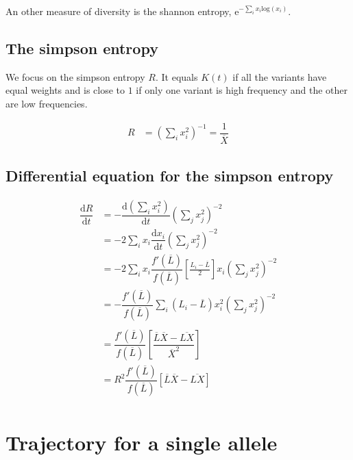 \documentclass{article}
\begin{document}
An other measure of diversity is the shannon entropy, $\mathrm{e}^{ - \sum_i x_i \mathrm{log}(x_i)}$. 

\subsection{The simpson entropy}
We focus on the simpson entropy $R$. It equals $K(t)$ if all the variants have equal weights and is close to $1$ if only one variant is high frequency and the other are low frequencies.

\begin{equation}
  \begin{aligned}
     R &= \left( \sum_i x_i^2  \right)^{-1} = \dfrac{1}{\overline{X}}
  \end{aligned}
\end{equation}

\subsection{Differential equation for the simpson entropy}
\begin{equation}
  \begin{aligned}
    \dfrac{\mathrm{d} R }{\mathrm{d}t} &=
    - \dfrac{\mathrm{d} \left( \sum_i x_i^2  \right)}{\mathrm{d}t} \left( \sum_j x_j^2  \right)^{-2} \\
    &=
   - 2  \sum_i x_i \dfrac{\mathrm{d} x_i }{\mathrm{d}t} \left( \sum_j x_j^2  \right)^{-2} \\
    &=
    - 2  \sum_i x_i \dfrac{f'(\overline{L})}{f(\overline{L})} \left[ \tfrac{L_i - \overline{L}}{2} \right]x_i \left( \sum_j x_j^2  \right)^{-2} \\
    &=
    - \dfrac{f'(\overline{L})}{f(\overline{L})} \sum_i (L_i - \overline{L})  x_i^2 \left( \sum_j x_j^2  \right)^{-2} \\
     \\
      &=
     \dfrac{f'(\overline{L})}{f(\overline{L})} \left[ \dfrac{\overline{L} \overline{X} - \overline{L X}}{ \overline{X} ^{2}} \right] \\
     &=
     R^2 \dfrac{f'(\overline{L})}{f(\overline{L})} \left[ \overline{L} \overline{X} - \overline{L X} \right] \\
  \end{aligned}
\end{equation}


\section{Trajectory for a single allele}
\end{document}
